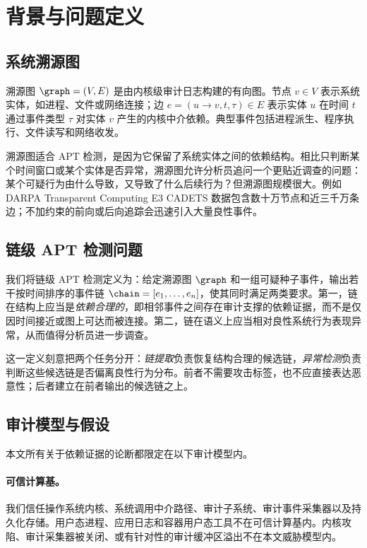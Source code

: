 \section{背景与问题定义}
\label{sec:background}

\subsection{系统溯源图}

溯源图 $\graph=(V,E)$ 是由内核级审计日志构建的有向图。节点 $v\in V$ 表示系统实体，如进程、文件或网络连接；边 $e=(u\rightarrow v,t,\tau)\in E$ 表示实体 $u$ 在时间 $t$ 通过事件类型 $\tau$ 对实体 $v$ 产生的内核中介依赖。典型事件包括进程派生、程序执行、文件读写和网络收发。

溯源图适合 APT 检测，是因为它保留了系统实体之间的依赖结构。相比只判断某个时间窗口或某个实体是否异常，溯源图允许分析员追问一个更贴近调查的问题：某个可疑行为由什么导致，又导致了什么后续行为？但溯源图规模很大。例如 DARPA Transparent Computing E3 CADETS 数据包含数十万节点和近三千万条边；不加约束的前向或后向追踪会迅速引入大量良性事件。

\subsection{链级 APT 检测问题}
\label{sec:problem}

我们将链级 APT 检测定义为：给定溯源图 $\graph$ 和一组可疑种子事件，输出若干按时间排序的事件链 $\chain=[e_1,\ldots,e_n]$，使其同时满足两类要求。第一，链在结构上应当是\emph{依赖合理的}，即相邻事件之间存在审计支撑的依赖证据，而不是仅因时间接近或图上可达而被连接。第二，链在语义上应当相对良性系统行为表现异常，从而值得分析员进一步调查。

这一定义刻意把两个任务分开：\emph{链提取}负责恢复结构合理的候选链，\emph{异常检测}负责判断这些候选链是否偏离良性行为分布。前者不需要攻击标签，也不应直接表达恶意性；后者建立在前者输出的候选链之上。

\subsection{审计模型与假设}
\label{sec:audit_model}

本文所有关于依赖证据的论断都限定在以下审计模型内。

\paragraph{可信计算基。}我们信任操作系统内核、系统调用中介路径、审计子系统、审计事件采集器以及持久化存储。用户态进程、应用日志和容器用户态工具不在可信计算基内。内核攻陷、审计采集器被关闭、或有针对性的审计缓冲区溢出不在本文威胁模型内。

